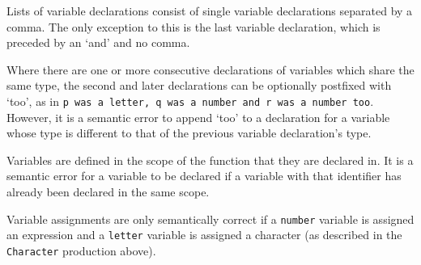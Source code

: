 \documentclass[a4wide, 11pt]{article}
\begin{document}
Lists of variable declarations consist of single variable declarations separated by a comma. The only exception to this is the last variable declaration, which is preceded by an `and' and no comma.

Where there are one or more consecutive declarations of variables which share the same type, the second and later declarations can be optionally postfixed with `too', as in \texttt{p was a letter, q was a number and r was a number too}. However, it is a semantic error to append `too' to a declaration for a variable whose type is different to that of the previous variable declaration's type.

Variables are defined in the scope of the function that they are declared in. It is a semantic error for a variable to be declared if a variable with that identifier has already been declared in the same scope.

Variable assignments are only semantically correct if a \texttt{number} variable is assigned an expression and a \texttt{letter} variable is assigned a character (as described in the \texttt{Character} production above).
\end{document}
